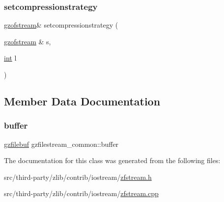 \mbox{\label{classgzfilestream__common_a37083e69bcbb72fd74685473a21eaa87}} 
\subsubsection{\texorpdfstring{setcompressionstrategy}{setcompressionstrategy}}
{\footnotesize\ttfamily \mbox{\hyperlink{classgzofstream}{gzofstream}}\& setcompressionstrategy (\begin{DoxyParamCaption}\item[{\mbox{\hyperlink{classgzofstream}{gzofstream}} \&}]{s,  }\item[{\mbox{\hyperlink{ioapi_8h_a787fa3cf048117ba7123753c1e74fcd6}{int}}}]{l }\end{DoxyParamCaption})\hspace{0.3cm}{\ttfamily [friend]}}



\subsection{Member Data Documentation}
\mbox{\label{classgzfilestream__common_ac78c60664b72739806952289a9602d32}} 
\subsubsection{\texorpdfstring{buffer}{buffer}}
{\footnotesize\ttfamily \mbox{\hyperlink{classgzfilebuf}{gzfilebuf}} gzfilestream\+\_\+common\+::buffer\hspace{0.3cm}{\ttfamily [private]}}



The documentation for this class was generated from the following files\+:\begin{DoxyCompactItemize}
\item 
src/third-\/party/zlib/contrib/iostream/\mbox{\hyperlink{zfstream_8h}{zfstream.\+h}}\item 
src/third-\/party/zlib/contrib/iostream/\mbox{\hyperlink{zfstream_8cpp}{zfstream.\+cpp}}\end{DoxyCompactItemize}
